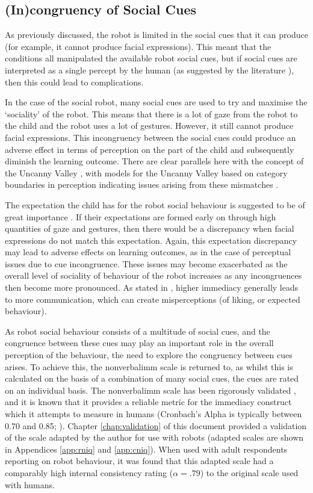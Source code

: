 \subsection{(In)congruency of Social Cues}
As previously discussed, the robot is limited in the social cues that it can produce (for example, it cannot produce facial expressions). This meant that the conditions all manipulated the available robot social cues, but if social cues are interpreted as a single percept by the human (as suggested by the literature \citealp{zaki2013cue}), then this could lead to complications.

In the case of the social robot, many social cues are used to try and maximise the `sociality' of the robot. This means that there is a lot of gaze from the robot to the child and the robot uses a lot of gestures. However, it still cannot produce facial expressions. This incongruency between the social cues could produce an adverse effect in terms of perception on the part of the child and subsequently diminish the \gls{learning} outcome. There are clear parallels here with the concept of the Uncanny Valley \citep{mori2012uncanny}, with models for the Uncanny Valley based on category boundaries in perception indicating issues arising from these mismatches \citep{moore2012bayesian}.

The expectation the child has for the robot social behaviour is suggested to be of great importance \citep{kennedy2015less}. If their expectations are formed early on through high quantities of gaze and gestures, then there would be a discrepancy when facial expressions do not match this expectation. Again, this expectation discrepancy may lead to adverse effects on \gls{learning} outcomes, as in the case of perceptual issues due to cue incongruence. These issues may become exacerbated as the overall level of sociality of behaviour of the robot increases as any incongruences then become more pronounced. As stated in \cite{richmond1987nonverbal}, higher immediacy generally leads to more communication, which can create misperceptions (of liking, or expected behaviour).

As robot social behaviour consists of a multitude of social cues, and the congruence between these cues may play an important role in the overall perception of the behaviour, the need to explore the congruency between cues arises. To achieve this, the \gls{nonverbalimm} scale is returned to, as whilst this is calculated on the basis of a combination of many social cues, the cues are rated on an individual basis. The \gls{nonverbalimm} scale has been rigorously validated \citep{mccroskey1996nonverbal,richmond2003development}, and it is known that it provides a reliable metric for the immediacy construct which it attempts to measure in humans (Cronbach's Alpha is typically between 0.70 and 0.85; \citealp{mccroskey1996nonverbal}). Chapter \ref{chap:validation} of this document provided a validation of the scale adapted by the author for use with robots (adapted scales are shown in Appendices \ref{app:rniq} and \ref{app:cniq}). When used with adult respondents reporting on robot behaviour, it was found that this adapted scale had a comparably high internal consistency rating ($\alpha=.79$) to the original scale used with humans.

